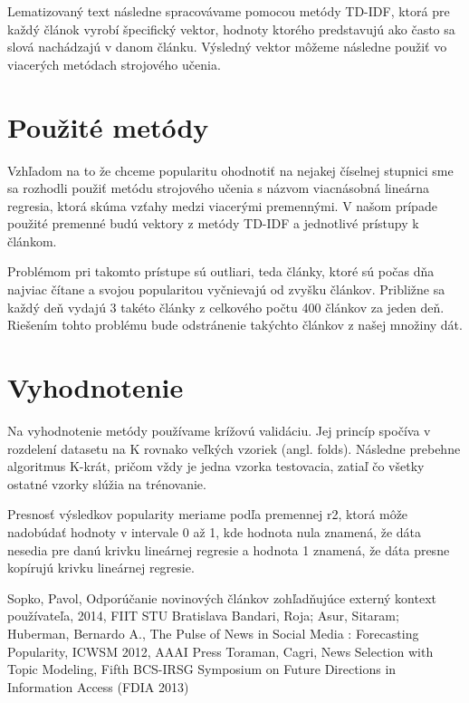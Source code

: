 \documentclass[runningheads,a4paper]{llncs}
\begin{document}
Lematizovaný text následne spracovávame pomocou metódy TD-IDF, ktorá pre každý článok vyrobí špecifický vektor, hodnoty ktorého predstavujú ako často sa slová nachádzajú v danom článku.
Výsledný vektor môžeme následne použiť vo viacerých metódach strojového učenia.

\section{Použité metódy}
Vzhľadom na to že chceme popularitu ohodnotiť na nejakej číselnej stupnici sme sa rozhodli použiť metódu strojového učenia s názvom viacnásobná lineárna regresia, ktorá skúma vzťahy medzi viacerými premennými.
V našom prípade použité premenné budú vektory z metódy TD-IDF a jednotlivé prístupy k článkom.

Problémom pri takomto prístupe sú outliari, teda články, ktoré sú počas dňa najviac čítane a svojou popularitou vyčnievajú od zvyšku článkov. Približne sa každý deň vydajú 3 takéto články z celkového počtu 400 článkov za jeden deň. Riešením tohto problému bude odstránenie takýchto článkov z našej množiny dát.



\section{Vyhodnotenie}
Na vyhodnotenie metódy používame krížovú validáciu.
Jej princíp spočíva v rozdelení datasetu na K rovnako veľkých vzoriek (angl. folds).
Následne prebehne algoritmus K-krát, pričom vždy je jedna vzorka testovacia, zatiaľ čo všetky ostatné vzorky slúžia na trénovanie.

Presnosť výsledkov popularity meriame podľa premennej r2, ktorá môže nadobúdať hodnoty v intervale 0 až 1, kde hodnota nula znamená, že dáta nesedia pre danú krivku lineárnej regresie a hodnota 1 znamená, že dáta presne kopírujú krivku lineárnej regresie.



\begin{thebibliography}{7}
   Sopko, Pavol, Odporúčanie novinových článkov zohľadňujúce externý kontext používateľa, 2014, FIIT STU Bratislava
   Bandari, Roja; Asur, Sitaram; Huberman, Bernardo A., The Pulse of News in Social Media : Forecasting Popularity, ICWSM 2012, AAAI Press
   Toraman, Cagri, News Selection with Topic Modeling, Fifth BCS-IRSG Symposium on Future Directions in Information Access (FDIA 2013)
\end{thebibliography}
\end{document}
